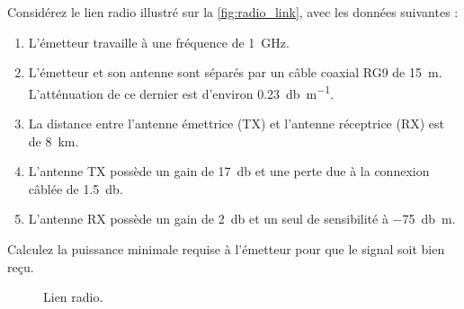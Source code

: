 \documentclass [a4paper, 11pt] {article}
\begin{document}
    \begin{exercice}{3}
    
        Considérez le lien radio illustré sur la \autoref{fig:radio_link}, avec les données suivantes :
        
        \begin{enumerate}
            \item L'émetteur travaille à une fréquence de \SI{1}{\giga\hertz}.
            \item L'émetteur et son antenne sont séparés par un câble coaxial RG9 de \SI{15}{\meter}. L'atténuation de ce dernier est d'environ \SI{0.23}{\decibel\per\meter}.
            \item La distance entre l'antenne émettrice (TX) et l'antenne réceptrice (RX) est de \SI{8}{\kilo\meter}.
            \item L'antenne TX possède un gain de \SI{17}{\decibel} et une perte due à la connexion câblée de \SI{1.5}{\decibel}.
            \item L'antenne RX possède un gain de \SI{2}{\decibel} et un seul de sensibilité à \SI{-75}{\decibel\meter}.
        \end{enumerate}
        
        Calculez la puissance minimale requise à l'émetteur pour que le signal soit bien reçu.
    
        \begin{figure}[H]
            \centering
            \caption{Lien radio.}
            \label{fig:radio_link}
        \end{figure}
    \end{exercice}
    
\end{document}
